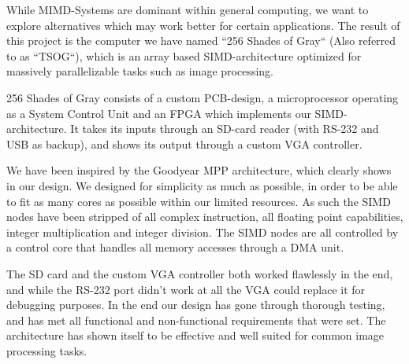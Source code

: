 While MIMD-Systems are dominant within general computing, we want to explore
alternatives which may work better for certain applications. The result of
this project is the computer we have named ``256 Shades of Gray`` (Also referred
to as ``TSOG``), which is an array based SIMD-architecture optimized for massively
parallelizable tasks such as image processing.

256 Shades of Gray consists of a custom PCB-design, a microprocessor operating as a
System Control Unit and an FPGA which implements our SIMD-architecture. It takes its
inputs through an SD-card reader (with RS-232 and USB as backup), and shows its
output through a custom VGA controller.

We have been inspired by the Goodyear MPP architecture, which clearly shows in our
design. We designed for simplicity as much as possible, in order to be able to fit
as many cores as possible within our limited resources. As such the SIMD nodes have
been stripped of all complex instruction, all floating point capabilities, integer
multiplication and integer division. The SIMD nodes are all controlled by a control
core that handles all memory accesses through a DMA unit.

The SD card and the custom VGA controller both worked flawlessly in the end, and while
the RS-232 port didn't work at all the VGA could replace it for debugging purposes.
In the end our design has gone through thorough testing, and has met all functional
and non-functional requirements that were set. The architecture has shown itself to
be effective and well suited for common image processing tasks.
\endgroup
